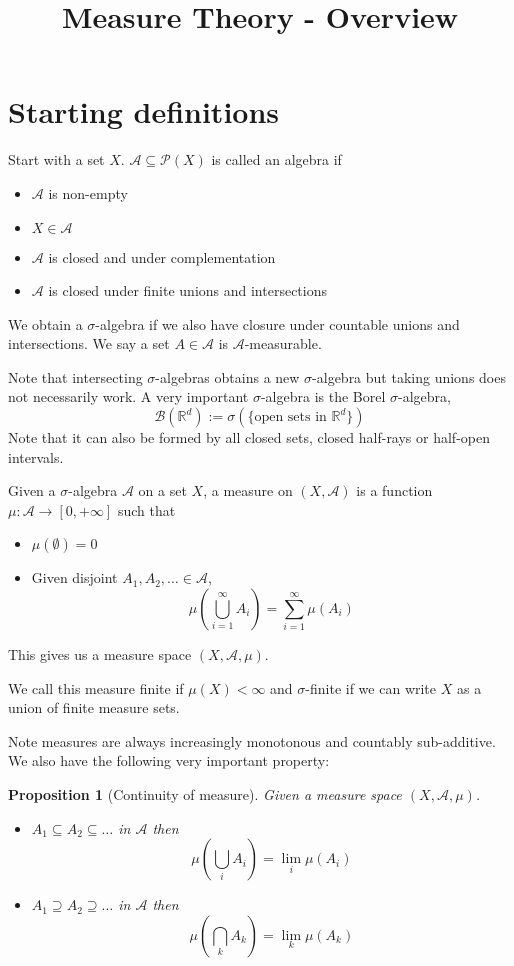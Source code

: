 \documentclass[11pt]{article}
\title{Measure Theory - Overview}
\author{}
\date{}
\newcommand{\defeq}{:=}
\newcommand{\msrspc}{\ensuremath{(X,\mathcal{A},\mu)}}
\newcommand{\sigal}{$\sigma$-algebra}
\newcommand{\pow}[1]{\mathcal{P}(#1)}
\newcommand{\R}{\mathbb{R}}
\newenvironment{defin}
	{\begin{mdframed}[backgroundcolor=white, roundcorner=5pt, linewidth=1pt]}
	{\end{mdframed}}
\newcommand{\mdf}[1]{{\color{red} #1}}
\newtheorem{prop}[theorem]{Proposition}
\begin{document}
\maketitle
\section{Starting definitions}
\begin{defin}
Start with a set $X$.
$\mathcal{A}\subseteq\pow{X}$ is called an \mdf{algebra} if 
\begin{itemize}
	\item $\mathcal{A}$ is non-empty
	\item $X\in \mathcal{A}$
	\item $\mathcal{A}$ is closed and under complementation
	\item $\mathcal{A}$ is closed under finite unions and intersections
\end{itemize}
We obtain a \mdf{\sigal} if we also have closure under countable unions and intersections.
We say a set $A\in\mathcal{A}$ is \mdf{$\mathcal{A}$-measurable}.
\end{defin}
Note that intersecting {\sigal s} obtains a new {\sigal} but taking unions does not necessarily work.
A very important {\sigal} is the \mdf{Borel \sigal},
$$\mathcal{B}(\R^d)\defeq\sigma\left(\{\text{open sets in }\R^d\}\right)$$
Note that it can also be formed by all closed sets, closed half-rays or half-open intervals.
\begin{defin}
	Given a {\sigal} $\mathcal{A}$ on a set $X$, a \mdf{measure} on $(X,\mathcal{A})$ is a function $\mu:\mathcal{A}\to[0,+\infty]$ such that
	\begin{itemize}
		\item $\mu(\emptyset)=0$
		\item Given disjoint $A_1,A_2,\dots\in\mathcal{A}$,
			$$\mu\left(\bigcup_{i=1}^\infty A_i\right)=\sum_{i=1}^\infty \mu(A_i)$$
	\end{itemize}
	This gives us a \mdf{measure space} \msrspc.
	
	We call this measure \mdf{finite} if $\mu(X)<\infty$ and \mdf{$\sigma$-finite} if we can write $X$ as a union of finite measure sets.
\end{defin}
Note measures are always increasingly monotonous and countably sub-additive.
We also have the following very important property:
\begin{prop}[Continuity of measure]
	Given a measure space \msrspc.
	\begin{itemize}
		\item $A_1\subseteq A_2\subseteq \dots$ in $\mathcal{A}$ then
			$$\mu\left(\bigcup_i A_i\right)=\lim_i\mu(A_i)$$
		\item $A_1\supseteq A_2\supseteq \dots$ in $\mathcal{A}$ then
			$$\mu\left(\bigcap_k A_k\right)=\lim_k \mu(A_k)$$
	\end{itemize}
\end{prop}
\end{document}
